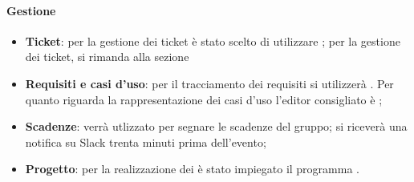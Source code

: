 	\paragraph{Gestione}
	\begin{itemize}
		\item \textbf{Ticket}: per la gestione dei ticket è stato scelto di utilizzare ; per la gestione dei ticket, si rimanda alla sezione %
		\item \textbf{Requisiti e casi d'uso}: per il tracciamento dei requisiti si utilizzerà . Per quanto riguarda la rappresentazione dei casi d'uso l'editor consigliato è ; %
		\item \textbf{Scadenze}:  verrà utlizzato per segnare le scadenze del gruppo; si riceverà una notifica su Slack trenta minuti prima dell'evento;
		\item \textbf{Progetto}: per la realizzazione dei  è stato impiegato il programma .
	\end{itemize}